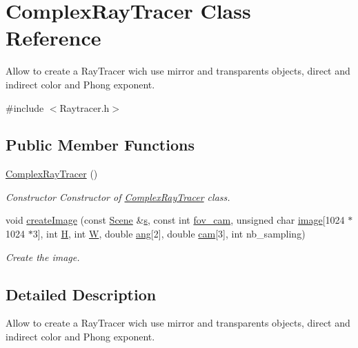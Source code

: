 \hypertarget{classComplexRayTracer}{}\section{Complex\+Ray\+Tracer Class Reference}
\label{classComplexRayTracer}


Allow to create a Ray\+Tracer wich use mirror and transparents objects, direct and indirect color and Phong exponent.  




{\ttfamily \#include $<$Raytracer.\+h$>$}

\subsection*{Public Member Functions}
\begin{DoxyCompactItemize}
\item 
\mbox{\label{classComplexRayTracer_a41893b2dd0c215b9cebb3e2e1be4f24a}} 
\hyperlink{classComplexRayTracer_a41893b2dd0c215b9cebb3e2e1be4f24a}{Complex\+Ray\+Tracer} ()
\begin{DoxyCompactList}\small\item\em Constructor Constructor of \hyperlink{classComplexRayTracer}{Complex\+Ray\+Tracer} class. \end{DoxyCompactList}\item 
void \hyperlink{classComplexRayTracer_a7f1ed1f42ac218e4aaf54fc81df39386}{create\+Image} (const \hyperlink{classScene}{Scene} \&\hyperlink{Main_8cpp_aecc1396fc611f6e71d5d70228e7b089a}{s}, const int \hyperlink{Main_8cpp_afac324b61ac0563c734fcdb81d98e344}{fov\+\_\+cam}, unsigned char \hyperlink{Main_8cpp_a92ebae258b9cd4407b2510c3d18633ee}{image}\mbox{[}1024 $\ast$1024 $\ast$3\mbox{]}, int \hyperlink{Main_8cpp_affa487e8e3cc48473cfc05c0ce0165e9}{H}, int \hyperlink{Main_8cpp_a2dd51e03005d5cb52315290d27f61870}{W}, double \hyperlink{Main_8cpp_a861ee06bf1e430650b4437260a119635}{ang}\mbox{[}2\mbox{]}, double \hyperlink{Main_8cpp_a9fe883a18727d129289b149e5f0305eb}{cam}\mbox{[}3\mbox{]}, int nb\+\_\+sampling)
\begin{DoxyCompactList}\small\item\em Create the image. \end{DoxyCompactList}\end{DoxyCompactItemize}


\subsection{Detailed Description}
Allow to create a Ray\+Tracer wich use mirror and transparents objects, direct and indirect color and Phong exponent. 

